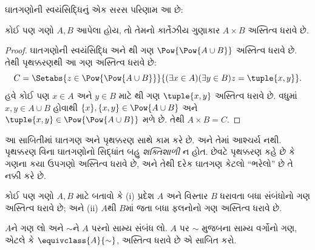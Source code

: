 ઘાતગણોની સ્વયંસિદ્ધિનું એક સરસ પરિણામ આ છે:

\begin{prop}\label{thm:Products}
કોઈ પણ ગણો $A, B$ આપેલા હોય, તો તેમનો કાર્તેઝીય ગુણાકાર
$A \times B$ અસ્તિત્વ ધરાવે છે.
\end{prop}

\begin{proof}
ઘાતગણોની સ્વયંસિદ્ધિ અને
થી ગણ
$\Pow{\Pow{A \cup B}}$ અસ્તિત્વ ધરાવે છે. તેથી પૃથક્કરણથી
આ ગણ અસ્તિત્વ ધરાવે છે:
\[
C = \Setabs{z \in \Pow{\Pow{A \cup B}}}{(\exists x \in A)(\exists y \in B) z = \tuple{x, y}}.
\]
હવે કોઈ પણ $x \in A$ અને $y \in B$ માટે
થી ગણ
$\tuple{x, y}$ અસ્તિત્વ ધરાવે છે. વધુમાં $x, y
\in A \cup B$ હોવાથી $\{x\}, \{x, y\} \in \Pow{A \cup B}$
અને $\tuple{x,y} \in \Pow{\Pow{A \cup B}}$ મળે છે.
તેથી $A \times B = C$.
\end{proof}

આ સાબિતીમાં ઘાતગણ અને પૃથક્કરણ સાથે કામ કરે છે. અને તેમાં
આશ્ચર્ય નથી. પૃથક્કરણ વિના ઘાતગણોનો સિદ્ધાંત બહુ
\emph{શક્તિશાળી} ન હોત. છેવટે પૃથક્કરણ કહે છે કે ગણના કયા
ઉપગણો અસ્તિત્વ ધરાવે છે, અને તેથી દરેક ઘાતગણ કેટલો ``ભરેલો''
છે તે નક્કી કરે છે.

\begin{prob}
કોઈ પણ ગણો $A, B$ માટે બતાવો કે (i) પ્રદેશ $A$ અને વિસ્તાર
$B$ ધરાવતા બધા સંબંધોનો ગણ અસ્તિત્વ ધરાવે છે; અને
(ii) $A$થી $B$માં જતા બધા ફલનોનો ગણ અસ્તિત્વ ધરાવે છે.
\end{prob}

\begin{prob}
$A$ને ગણ લો અને $\sim$ને $A$ પરનો સામ્ય સંબંધ લો.
$A$ પર $\sim$ મુજબના સામ્ય વર્ગોનો ગણ, એટલે કે
$\equivclass{A}{\sim}$, અસ્તિત્વ ધરાવે છે એ સાબિત કરો.
\end{prob}
\endgroup

\begingroup
\makeatletter{}\makeatother

\label{guunit:OLP-0543}


